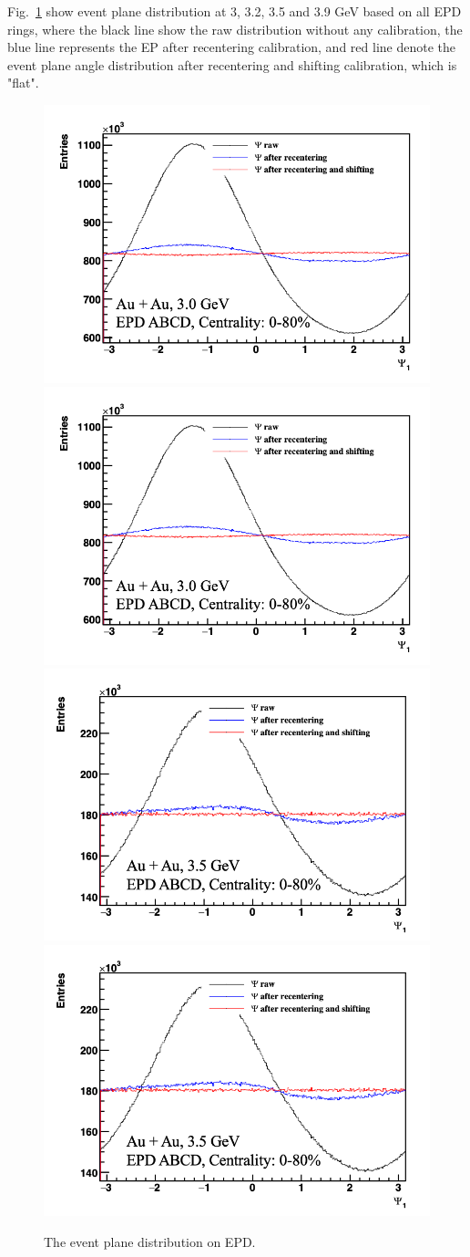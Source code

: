 Fig.~\ref{fig:EP_distribution} show event plane distribution at 3, 3.2, 3.5 and 3.9 GeV based on all EPD rings,
where the black line show the raw distribution without any calibration, the blue line represents the EP after recentering calibration, 
and red line denote the event plane angle distribution after recentering and shifting calibration, which is "flat".
\begin{figure}[hbt!]
\centering
\includegraphics[width=0.45\linewidth]{figures/chapter02/EP_3GeV.png}
\includegraphics[width=0.45\linewidth]{figures/chapter02/EP_3GeV.png}
\includegraphics[width=0.45\linewidth]{figures/chapter02/EP_3p5GeV.png}
\includegraphics[width=0.45\linewidth]{figures/chapter02/EP_3p5GeV.png}
\caption{The event plane distribution on EPD.}
\label{fig:EP_distribution}
\end{figure}

